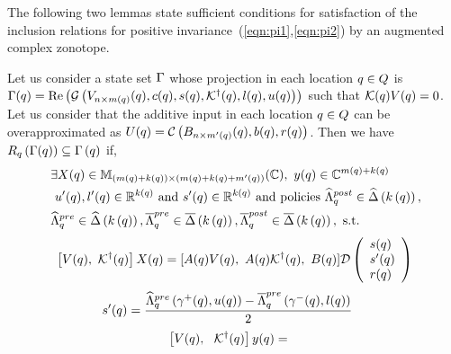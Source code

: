 The following two lemmas state sufficient conditions for satisfaction of
the inclusion relations for positive invariance~(\ref{eqn:pi1},\ref{eqn:pi2}) by
an augmented complex zonotope.
\begin{lemma}
  Let us consider a state set $\Gamma$ whose projection in each
  location $q\in Q$ is $\Gamma(q) =
  \operatorname{\operatorname{Re}}\left(\mathcal{G}\left(V_{n\times m(q)}(q),c(q),s(q),\mathcal{K}^\dagger(q),l(q),u(q)\right)\right)$
  such that $\mathcal{K}(q)V(q) = 0$.  Let us consider that the
  additive input in each location $q\in Q$ can be
  overapproximated as $U(q) = \mathcal{C}\left(B_{n\times
      m^\prime(q)}(q),b(q),r(q)\right)$.  Then we have
  $R_{q}\left(\Gamma(q)\right) \subseteq
  \Gamma\left(q\right)$ if,
\begin{align}
\begin{split}~\label{eqn:exists-intra}
& \exists
  X(q)\in\mathbb{M}_{\left(m(q)+k(q)\right)\times \left(m(q)+k(q)+m^\prime(q)\right)}(\mathbb{\mathbb{C}}),~
  y(q)\in\mathbb{C}^{m(q)+k(q)}\\&~u^\prime(q),l^\prime(q)\in\mathbb{R}^{k(q)}~\text{and}~s^\prime(q)\in\mathbb{R}^{k(q)}~\text{and
    policies}~
\widehat{\Lambda}_{q}^{post}\in\widehat{\Delta}\left(k\left(q\right)\right),\\
&\widehat{\Lambda}_{q}^{pre}\in\widehat{\Delta}\left(k\left(q\right)\right),\overline{\Lambda}_{q}^{pre}\in\overline{\Delta}\left(k\left(q\right)\right),
\overline{\Lambda}_{q}^{post}\in\overline{\Delta}\left(k\left(q\right)\right),~\text{s.t.}
\end{split}
\end{align}
\begin{align}
\begin{split}
& \left[V(q),~\mathcal{K}^\dagger(q)\right]X(q) =
  [A(q)V(q),~A(q)\mathcal{K}^\dagger(q),~B(q)]\mathcal{D}\left(\begin{array}{l}s(q)\\s^\prime(q)\\r(q)\end{array}\right)\\
\end{split}
\end{align}
\begin{align}
\begin{split}
& s^\prime(q) = \frac{\widehat{\Lambda}_{q}^{pre}\left(\gamma^+(q),u(q)\right)
      -\overline{\Lambda}_{q}^{pre}\left(\gamma^-(q),l(q)\right)}{2}
\end{split}
\end{align}
\begin{align}
\begin{split}
  & \left[V(\loc),~~\pinv{\ptemplate}(\loc)\rt]y(\loc) = 

\end{split}
\end{align}
\end{lemma}
